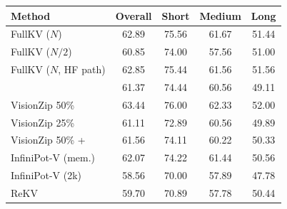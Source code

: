 \begin{tabular}{l|cccc}
\toprule
\textbf{Method} & Overall & Short & Medium & Long \\
\midrule
FullKV ($N$) & 62.89 & 75.56 & 61.67 & 51.44 \\
FullKV ($N/2$) & 60.85 & 74.00 & 57.56 & 51.00 \\
FullKV ($N$, HF path) & 62.85 & 75.44 & 61.56 & 51.56 \\
\midrule
\method{} & 61.37 & 74.44 & 60.56 & 49.11 \\
VisionZip 50\% & 63.44 & 76.00 & 62.33 & 52.00 \\
VisionZip 25\% & 61.11 & 72.89 & 60.56 & 49.89 \\
VisionZip 50\% + \method{} & 61.56 & 74.11 & 60.22 & 50.33 \\
InfiniPot-V (mem.) & 62.07 & 74.22 & 61.44 & 50.56 \\
InfiniPot-V (2k) & 58.56 & 70.00 & 57.89 & 47.78 \\
ReKV & 59.70 & 70.89 & 57.78 & 50.44 \\
\bottomrule
\end{tabular}

